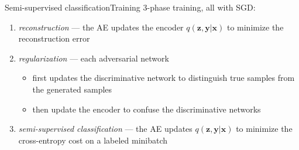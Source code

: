 \documentclass[10pt]{beamer}
\DeclareMathOperator{\Cat}{Cat}
\DeclareMathOperator{\Norm}{\mathcal N}
\DeclareMathOperator{\Id}{\mathbf I}
\newcommand{\vect}[1]{\boldsymbol{#1}} %
\begin{document}

\begin{frame}{Semi-supervised classification}{Training}
3-phase training, all with SGD:
\begin{enumerate}
  \item \textit{reconstruction} — the AE updates the encoder $ q(\vect z, \vect y | \vect x) $ to minimize the reconstruction error
  \item \textit{regularization} — each adversarial network
  \begin{itemize}
    \item first updates the discriminative network to distinguish true samples from the generated samples
    \item then update the encoder to confuse the discriminative networks
  \end{itemize}
  \item \textit{semi-supervised classification} — the AE updates $ q(\vect z, \vect y | \vect x) $ to minimize the cross-entropy cost on a labeled minibatch
\end{enumerate}
\end{frame}
\end{document}
